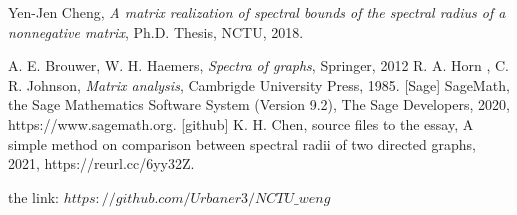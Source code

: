 \documentclass[12pt, a4paper]{article}
\theoremstyle{plain}
\theoremstyle{definition}
\begin{document}
\begin{thebibliography}{20}
\normalsize
{}

Yen-Jen Cheng, {\it  A matrix realization of spectral bounds
of the spectral radius of a nonnegative matrix}, Ph.D. Thesis, NCTU, 2018.

A. E. Brouwer, W. H. Haemers, {\it Spectra of graphs}, Springer, 2012
R. A. Horn , C. R. Johnson, {\it Matrix analysis}, Cambrigde University Press, 1985.
[Sage] SageMath, the Sage Mathematics Software System (Version 9.2),
       The Sage Developers, 2020, https://www.sagemath.org.  %
[github] K. H. Chen, source files to the essay, A simple method on comparison between spectral radii of two directed graphs,
     2021, https://reurl.cc/6yy32Z.  %

     \newblock the link: $https://github.com/Urbaner3/NCTU\_weng$
    

\end{thebibliography}
\end{document}
